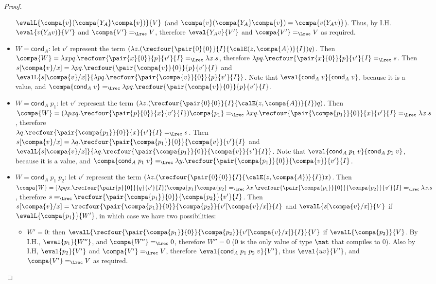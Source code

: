 \documentclass{article}
\begin{document}
\begin{proof}
\begin{itemize}
$\evalL{\compa{v}(\compa{Y_A}\compa{v})}{V}$ (and
$\compa{v}(\compa{Y_A}\compa{v})=\compa{v(Y_A v)} $). Thus, by I.H.
$\eval{v(Y_A v)}{V'}$ and  $\compa{V'} =_{\Lrec} V$, therefore
$\eval{Y_A v}{V'}$ and  $\compa{V'} =_{\Lrec} V$ as required.
\item $W=\mathsf{cond}_A$: let $v'$ represent the term $(\lambda
z.(\recfour{\pair{0}{0}}{I}{\calE(z,\compa{A})}{I})q)$. Then $\compa{W}
= \lambda xpq.\recfour{\pair{x}{0}}{p}{v'}{I} =_{\Lrec} \lambda x.s$,
therefore $\lambda p q.\recfour{\pair{x}{0}}{p}{v'}{I} =_{\Lrec} s$.
Then $s[\compa{v}/x] = \lambda
pq.\recfour{\pair{\compa{v}}{0}}{p}{v'}{I}$ and
$\evalL{s[\compa{v}/x]}{\lambda
pq.\recfour{\pair{\compa{v}}{0}}{p}{v'}{I}}$. Note that
$\eval{\mathsf{cond}_A\; v}{\mathsf{cond}_A\; v}$, because it is a
value, and $\compa{\mathsf{cond}_A \;v}=_{\Lrec} \lambda
pq.\recfour{\pair{\compa{v}}{0}}{p}{v'}{I}$.
\item $W=\mathsf{cond}_A\;p_1$: let $v'$ represent the term $(\lambda
z.(\recfour{\pair{0}{0}}{I}{\calE(z,\compa{A})}{I})q)$. Then $\compa{W}
= (\lambda pxq.\recfour{\pair{p}{0}}{x}{v'}{I}) \compa{p_1} =_{\Lrec}
\lambda xq.\recfour{\pair{\compa{p_1}}{0}}{x}{v'}{I}=_{\Lrec} \lambda
x.s$, therefore\\
  $\lambda q.\recfour{\pair{\compa{p_1}}{0}}{x}{v'}{I}
=_{\Lrec} s$. Then $s[\compa{v}/x] = \lambda
q.\recfour{\pair{\compa{p_1}}{0}}{\compa{v}}{v'}{I}$ and
$\evalL{s[\compa{v}/x]}{\lambda
q.\recfour{\pair{\compa{p_1}}{0}}{\compa{v}}{v'}{I}}$. Note that
$\eval{\mathsf{cond}_A\; p_1\; v}{\mathsf{cond}_A\; p_1\; v}$, because
it is a value, and $\compa{\mathsf{cond}_A\;p_1 \;v}=_{\Lrec} \lambda
y.\recfour{\pair{\compa{p_1}}{0}}{\compa{v}}{v'}{I}$.
\item $W=\mathsf{cond}_A\;p_1\;p_2$: let $v'$ represent the term
$(\lambda z.(\recfour{\pair{0}{0}}{I}{\calE(z,\compa{A})}{I})x)$. Then
$\compa{W} =  (\lambda pqx.\recfour{\pair{p}{0}}{q}{v'}{I}) \compa{p_1} \compa{p_2}
=_{\Lrec}\lambda x.\recfour{\pair{\compa{p_1}}{0}}{\compa{p_2}}{v'}{I} =_{\Lrec} \lambda
x.s$, therefore $s=_{\Lrec} \recfour{\pair{\compa{p_1}}{0}}{\compa{p_2}}{v'}{I}
$. Then $s[\compa{v}/x] =
\recfour{\pair{\compa{p_1}}{0}}{\compa{p_2}}{v'[\compa{v}/x]}{I}$ and
$\evalL{s[\compa{v}/x]}{V}$ if $\evalL{\compa{p_1}}{W'}$, in which case
we have two possibilities:
\begin{itemize}
\item $W' = 0$: then
$\evalL{\recfour{\pair{\compa{p_1}}{0}}{\compa{p_2}}{v'[\compa{v}/x]}{I}}{V}$ if $\evalL{\compa{p_2}}{V}$. By I.H., $\eval{p_1}{W''}$, and $\compa{W''}  =_{\Lrec} 0$, therefore $W'' = 0$ ($0$ is the only value of type $\nat$ that compiles to $0$). Also by I.H, $\eval{p_2}{V'}$ and $\compa{V'} =_{\Lrec} V$, therefore $\eval{\mathsf{cond}_A\;p_1\;p_2\;v}{V'}$, thus $\eval{uv}{V'}$, and $\compa{V'} =_{\Lrec} V$ as required.

\end{itemize}
\end{itemize}
\end{proof}
\end{document}
